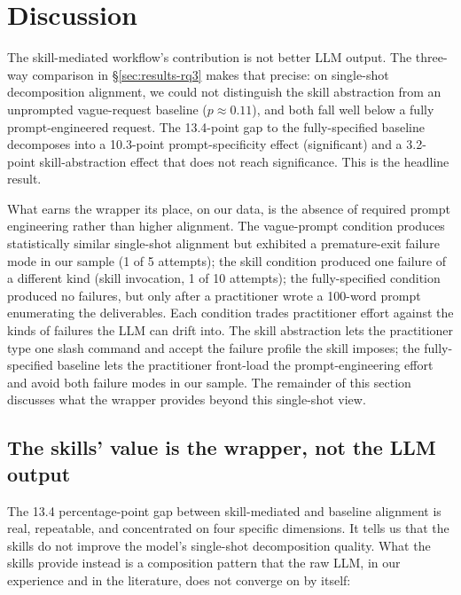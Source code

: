 \documentclass[journal]{IEEEtran}
\begin{document}
\section{Discussion}
\label{sec:discussion}

The skill-mediated workflow's contribution is not better LLM output.
The three-way comparison in \S\ref{sec:results-rq3} makes that
precise: on single-shot decomposition alignment, we could not
distinguish the skill abstraction from an unprompted vague-request
baseline ($p \approx 0.11$), and both fall well below a fully
prompt-engineered request. The 13.4-point gap to the
fully-specified baseline decomposes into a 10.3-point
prompt-specificity effect (significant) and a 3.2-point
skill-abstraction effect that does not reach significance. This
is the headline result.

What earns the wrapper its place, on our data, is the absence of
required prompt engineering rather than higher alignment. The
vague-prompt condition produces statistically similar single-shot
alignment but exhibited a premature-exit failure mode in our sample
(1 of 5 attempts); the skill condition produced one failure of a
different kind (skill invocation, 1 of 10 attempts); the
fully-specified condition produced no failures, but only after a
practitioner wrote a 100-word prompt enumerating the deliverables.
Each condition trades practitioner effort against the kinds of
failures the LLM can drift into. The skill abstraction lets the
practitioner type one slash command and accept the failure profile
the skill imposes; the fully-specified baseline lets the
practitioner front-load the prompt-engineering effort and avoid
both failure modes in our sample. The remainder of this section
discusses what the wrapper provides beyond this single-shot
view.

\subsection{The skills' value is the wrapper, not the LLM output}

The 13.4 percentage-point gap between skill-mediated and baseline
alignment is real, repeatable, and concentrated on four specific
dimensions. It tells us that the skills do not improve the model's
single-shot decomposition quality. What the skills provide instead
is a composition pattern that the raw LLM, in our experience and
in the literature, does not converge on by itself:
\end{document}
